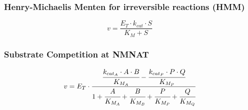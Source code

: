 \documentclass[a4paper,10pt]{article} \usepackage[utf8x]{inputenc}
\begin{document}
\subsubsection*{Henry-Michaelis Menten for irreversible reactions (HMM)}
\begin{equation}
v=\frac{E_T\cdot k_{cat}\cdot S}{K_M + S}
\end{equation}


\subsubsection*{Substrate Competition at NMNAT}
\begin{equation}
v=E_T \cdot \cfrac{\cfrac{k_{{cat}_{A}}\cdot A \cdot
B}{K_{{M}_A}}-\cfrac{k_{{cat}_{P}}\cdot P \cdot
Q}{K_{{M}_P}}}{1+\cfrac{A}{K_{{M}_A}}+\cfrac{B}{K_{{M}_B}}+\cfrac{P}{K_{{M}_P}}+\cfrac{Q}{K_{{M}_Q}}}
\end{equation}





\end{document}
